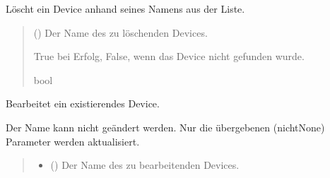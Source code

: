 \documentclass[letterpaper,10pt,english]{sphinxmanual}
\begin{document}
\begin{fulllineitems}
\begin{fulllineitems}
\end{fulllineitems}


\begin{fulllineitems}
\label{\detokenize{modulab/device_manager:modules.device.DeviceManager.DeviceManager.delete_device}}
\pysigstartsignatures
\pysiglinewithargsret
{}
{}
{}
\pysigstopsignatures
\sphinxAtStartPar
Löscht ein Device anhand seines Namens aus der Liste.
\begin{quote}\begin{description}
\sphinxAtStartPar
{} () \textendash{} Der Name des zu löschenden Devices.

\sphinxAtStartPar
True bei Erfolg, False, wenn das Device nicht gefunden wurde.

\sphinxAtStartPar
bool

\end{description}\end{quote}

\end{fulllineitems}


\begin{fulllineitems}
\label{\detokenize{modulab/device_manager:modules.device.DeviceManager.DeviceManager.edit_device}}
\pysigstartsignatures
\pysiglinewithargsret
{}
{\sphinxparamcomma {}\sphinxparamcomma {}\sphinxparamcomma {}}
{}
\pysigstopsignatures
\sphinxAtStartPar
Bearbeitet ein existierendes Device.

\sphinxAtStartPar
Der Name kann nicht geändert werden. Nur die übergebenen (nicht\sphinxhyphen{}None)
Parameter werden aktualisiert.
\begin{quote}\begin{description}
\begin{itemize}
\item {} 
\sphinxAtStartPar
{} () \textendash{} Der Name des zu bearbeitenden Devices.


\end{itemize}
\end{description}
\end{quote}
\end{fulllineitems}
\end{fulllineitems}
\end{document}
